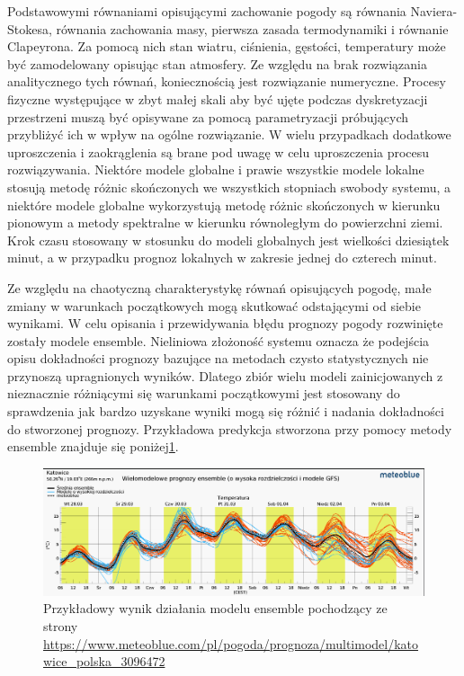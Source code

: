 Podstawowymi równaniami opisującymi zachowanie pogody są równania Naviera-Stokesa, równania zachowania
masy, pierwsza zasada termodynamiki i równanie Clapeyrona. Za pomocą nich stan wiatru, ciśnienia,
gęstości, temperatury może być zamodelowany opisując stan atmosfery. Ze względu na brak rozwiązania
analitycznego tych równań, koniecznością jest rozwiązanie numeryczne. Procesy fizyczne występujące
w zbyt małej skali aby być ujęte podczas dyskretyzacji przestrzeni muszą być opisywane za pomocą
parametryzacji próbujących przybliżyć ich w wpływ na ogólne rozwiązanie. W wielu przypadkach 
dodatkowe uproszczenia i zaokrąglenia są brane pod uwagę w celu uproszczenia procesu
rozwiązywania. Niektóre modele globalne i prawie wszystkie modele lokalne stosują 
metodę różnic skończonych we wszystkich stopniach swobody systemu, a niektóre modele globalne
wykorzystują metodę różnic skończonych w kierunku pionowym a metody spektralne w kierunku równoległym
do powierzchni ziemi. Krok czasu stosowany w stosunku do modeli globalnych jest wielkości dziesiątek
minut, a w przypadku prognoz lokalnych w zakresie jednej do czterech minut.

Ze względu na chaotyczną charakterystykę równań opisujących pogodę, małe zmiany w warunkach początkowych
mogą skutkować odstającymi od siebie wynikami. W celu opisania i przewidywania błędu prognozy pogody 
rozwinięte zostały modele ensemble. Nieliniowa złożoność systemu oznacza że podejścia opisu
dokładności prognozy bazujące na metodach czysto statystycznych nie przynoszą upragnionych wyników.
Dlatego zbiór wielu modeli zainicjowanych z nieznacznie różniącymi się warunkami początkowymi
jest stosowany do sprawdzenia jak bardzo uzyskane wyniki mogą się różnić i nadania dokładności do 
stworzonej prognozy. Przykładowa predykcja stworzona przy pomocy metody ensemble znajduje się 
poniżej\ref{nwp-ensemble}.

\begin{figure}[H]
    \centering
    \includegraphics[width=\textwidth]{images/multimodel.png}
    \caption{Przykładowy wynik działania modelu ensemble pochodzący ze strony 
        \url{https://www.meteoblue.com/pl/pogoda/prognoza/multimodel/katowice_polska_3096472}}
    \label{nwp-ensemble}
\end{figure}

